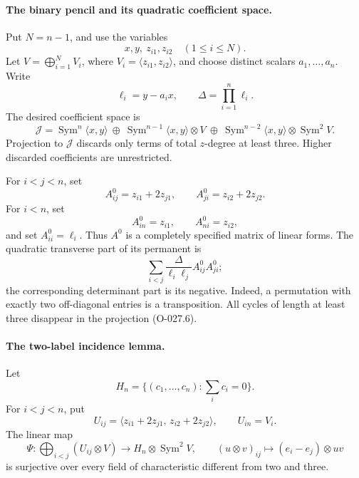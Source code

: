 \paragraph{The binary pencil and its quadratic coefficient space.}
Put \(N=n-1\), and use the variables
\[
                 x,y,\ z_{i1},z_{i2}\quad(1\leq i\leq N).
                                                               \tag{O-027.5}
\]
Let \(V=\bigoplus_{i=1}^{N}V_i\), where
\(V_i=\langle z_{i1},z_{i2}\rangle\), and choose distinct scalars
\(a_1,\ldots,a_n\). Write
\[
                \ell_i=y-a_i x,\qquad \Delta=\prod_{i=1}^n\ell_i.
\]
The desired coefficient space is
\[
 \mathcal J=
 \operatorname{Sym}^n\langle x,y\rangle
 \ \oplus\
 \operatorname{Sym}^{n-1}\langle x,y\rangle\otimes V
 \ \oplus\
 \operatorname{Sym}^{n-2}\langle x,y\rangle\otimes\operatorname{Sym}^2V.
                                                               \tag{O-027.6}
\]
Projection to \(\mathcal J\) discards only terms of total \(z\)-degree
at least three. Higher discarded coefficients are unrestricted.

For \(i<j<n\), set
\[
 A^0_{ij}=z_{i1}+2z_{j1},\qquad
 A^0_{ji}=z_{i2}+2z_{j2}.
\]
For \(i<n\), set
\[
                  A^0_{in}=z_{i1},\qquad A^0_{ni}=z_{i2},
\]
and set \(A^0_{ii}=\ell_i\).
Thus \(A^0\) is a completely specified matrix of linear forms.
The quadratic transverse part of its permanent is
\[
       \sum_{i<j}\frac{\Delta}{\ell_i\ell_j}A^0_{ij}A^0_{ji};
                                                               \tag{O-027.7}
\]
the corresponding determinant part is its negative.
Indeed, a permutation with exactly two off-diagonal entries is a
transposition. All cycles of length at least three disappear in
the projection (O-027.6).

\paragraph{The two-label incidence lemma.}
Let
\[
 H_n=\{(c_1,\ldots,c_n):\textstyle\sum_i c_i=0\}.
\]
For \(i<j<n\), put
\[
 U_{ij}=\langle z_{i1}+2z_{j1},\,z_{i2}+2z_{j2}\rangle,
 \qquad U_{in}=V_i.
\]
The linear map
\[
 \Psi:\bigoplus_{i<j}(U_{ij}\otimes V)
       \longrightarrow H_n\otimes\operatorname{Sym}^2V,
 \qquad
 (u\otimes v)_{ij}\longmapsto(e_i-e_j)\otimes uv
                                                               \tag{O-027.8}
\]
is surjective over every field of characteristic different from
two and three.


